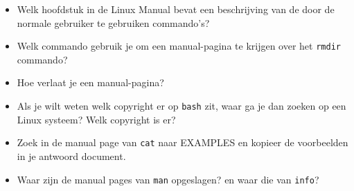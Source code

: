 \begin{itemize}
\item Welk hoofdstuk in de Linux Manual bevat een beschrijving van de door de normale gebruiker te gebruiken commando's?
\item Welk commando gebruik je om een manual-pagina te krijgen over het \texttt{rmdir} commando?
\item Hoe verlaat je een manual-pagina?
\item Als je wilt weten welk copyright er op \texttt{bash} zit, waar ga je dan zoeken op een Linux systeem? Welk copyright is er?
\item Zoek in de manual page van \texttt{cat} naar EXAMPLES en kopieer de voorbeelden in je antwoord document.
\item Waar zijn de manual pages van \texttt{man} opgeslagen? en waar die van \texttt{info}?
\end{itemize}
